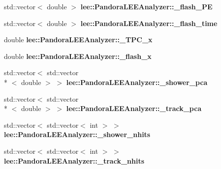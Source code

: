 \begin{DoxyCompactItemize}
\item 
\hypertarget{group__lee_ga9320e2f0e9a7e201a978a21a2eb74a39}{std\-::vector$<$ double $>$ {\bfseries lee\-::\-Pandora\-L\-E\-E\-Analyzer\-::\-\_\-flash\-\_\-\-P\-E}}\label{group__lee_ga9320e2f0e9a7e201a978a21a2eb74a39}

\item 
\hypertarget{group__lee_gaecdf711df932ed4823d2c9b222a3e8f4}{std\-::vector$<$ double $>$ {\bfseries lee\-::\-Pandora\-L\-E\-E\-Analyzer\-::\-\_\-flash\-\_\-time}}\label{group__lee_gaecdf711df932ed4823d2c9b222a3e8f4}

\item 
\hypertarget{group__lee_ga8c55bb8de6e184c1adbc191f3d6f12d5}{double {\bfseries lee\-::\-Pandora\-L\-E\-E\-Analyzer\-::\-\_\-\-T\-P\-C\-\_\-x}}\label{group__lee_ga8c55bb8de6e184c1adbc191f3d6f12d5}

\item 
\hypertarget{group__lee_ga5d01876afb52464a4e5f508f58f1f2cc}{double {\bfseries lee\-::\-Pandora\-L\-E\-E\-Analyzer\-::\-\_\-flash\-\_\-x}}\label{group__lee_ga5d01876afb52464a4e5f508f58f1f2cc}

\item 
\hypertarget{group__lee_ga5ed991b6864eb5cfbfb10298ec9cfc64}{std\-::vector$<$ std\-::vector\\*
$<$ double $>$ $>$ {\bfseries lee\-::\-Pandora\-L\-E\-E\-Analyzer\-::\-\_\-shower\-\_\-pca}}\label{group__lee_ga5ed991b6864eb5cfbfb10298ec9cfc64}

\item 
\hypertarget{group__lee_ga9959360c0dd79addecff84a12dba3d49}{std\-::vector$<$ std\-::vector\\*
$<$ double $>$ $>$ {\bfseries lee\-::\-Pandora\-L\-E\-E\-Analyzer\-::\-\_\-track\-\_\-pca}}\label{group__lee_ga9959360c0dd79addecff84a12dba3d49}

\item 
\hypertarget{group__lee_gaabf1f57f8aef33cad913d8597e68ae52}{std\-::vector$<$ std\-::vector$<$ int $>$ $>$ {\bfseries lee\-::\-Pandora\-L\-E\-E\-Analyzer\-::\-\_\-shower\-\_\-nhits}}\label{group__lee_gaabf1f57f8aef33cad913d8597e68ae52}

\item 
\hypertarget{group__lee_ga4dc8bfc10c4854c7bb093bdee63291e9}{std\-::vector$<$ std\-::vector$<$ int $>$ $>$ {\bfseries lee\-::\-Pandora\-L\-E\-E\-Analyzer\-::\-\_\-track\-\_\-nhits}}\label{group__lee_ga4dc8bfc10c4854c7bb093bdee63291e9}

\end{DoxyCompactItemize}


